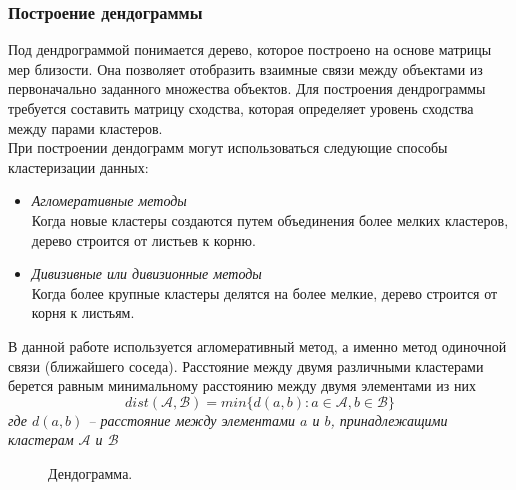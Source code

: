 \documentclass[a4paper,14pt]{extreport} %
\begin{document}
\subsubsection{Построение дендограммы}

Под дендрограммой понимается дерево, которое построено на основе матрицы мер близости. Она позволяет отобразить взаимные связи между объектами из первоначально заданного множества объектов. Для построения дендрограммы требуется составить матрицу сходства, которая определяет уровень сходства между парами кластеров. \\
При построении дендограмм могут использоваться следующие способы кластеризации данных:
\begin{itemize}
\item {\it Агломеративные методы} \\
Когда новые кластеры создаются путем объединения более мелких кластеров, дерево строится от листьев к корню.
\item {\it Дивизивные или дивизионные методы} \\
Когда более крупные кластеры делятся на более мелкие, дерево строится от корня к листьям.
\end{itemize}
В данной работе используется агломеративный метод, а именно метод одиночной связи (ближайшего соседа).
Расстояние между двумя различными кластерами берется равным минимальному расстоянию между двумя элементами из них
\textit{
\begin{equation}
\label{dendogramm_algo}
 dist(\mathcal{A},\mathcal{B}) = min \{ d(a, b) : a \in \mathcal{A}, b \in \mathcal{B} \}
\end{equation}
где $d(a, b)$ -- расстояние между элементами $a$ и $b$, принадлежащими кластерам $\mathcal{A}$ и $\mathcal{B}$ 
}

\begin{figure}[H]
\caption{Дендограмма.}
\label{user-stories}
\end{figure}
\end{document}
